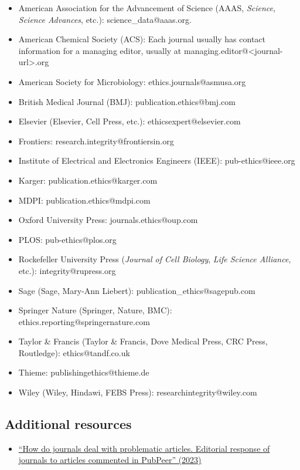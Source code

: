 \documentclass[letterpaper, 12pt]{article}
\begin{document}
\begin{itemize}
    \setlength\itemsep{-0.5em}
    \item American Association for the Advancement of Science (AAAS, \textit{Science}, \textit{Science Advances}, etc.):  science\_data@aaas.org.
    \item American Chemical Society (ACS): Each journal usually has contact information for a managing editor, usually at managing.editor@<journal-url>.org
    \item American Society for Microbiology: ethics.journals@asmusa.org
    \item British Medical Journal (BMJ): publication.ethics@bmj.com
    \item Elsevier (Elsevier, Cell Press, etc.): ethicsexpert@elsevier.com
    \item Frontiers: research.integrity@frontiersin.org
    \item Institute of Electrical and Electronics Engineers (IEEE): pub-ethics@ieee.org
    \item Karger: publication.ethics@karger.com
    \item MDPI: publication.ethics@mdpi.com
    \item Oxford University Press: journals.ethics@oup.com
    \item PLOS: pub-ethics@plos.org
    \item Rockefeller University Press (\textit{Journal of Cell Biology}, \textit{Life Science Alliance}, etc.): integrity@rupress.org
    \item Sage (Sage, Mary-Ann Liebert): publication\_ethics@sagepub.com
    \item Springer Nature (Springer, Nature, BMC): ethics.reporting@springernature.com
    \item Taylor \& Francis (Taylor \& Francis, Dove Medical Press, CRC Press, Routledge): ethics@tandf.co.uk
    \item Thieme: publishingethics@thieme.de
    \item Wiley (Wiley, Hindawi, FEBS Press): researchintegrity@wiley.com
\end{itemize}

\subsection*{Additional resources}

\begin{itemize}
    \setlength\itemsep{-0.5em}
    \item \href{https://doi.org/10.3145/epi.2023.ene.18}{``How do journals deal with problematic articles. Editorial response of journals to articles commented in PubPeer'' (2023)}
\end{itemize}
\end{document}

